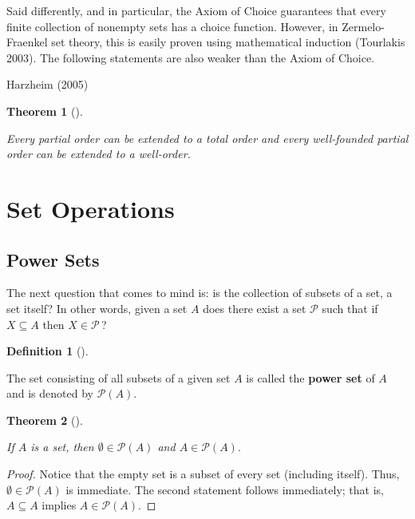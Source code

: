 \documentclass[
  letterpaper,
  10pt,
  reqno,
  twopage,
  openany]{book}
\theoremstyle{plain}
\theoremstyle{definition}
\theoremstyle{definition}
\newtheorem{definition}{Definition}[chapter]
\theoremstyle{definition}
\theoremstyle{plain}
\theoremstyle{plain}
\newtheorem{theorem}{Theorem}[chapter]
\theoremstyle{remark}
\begin{document}
Said differently, and in particular, the Axiom of Choice guarantees that
every finite collection of nonempty sets has a choice function. However,
in Zermelo-Fraenkel set theory, this is easily proven using mathematical
induction (Tourlakis 2003). The following statements are also weaker
than the Axiom of Choice.

Harzheim (2005)

\leavevmode{}%
\begin{theorem}[]\label{thm-extendord}

Every partial order can be extended to a total order and every
well-founded partial order can be extended to a well-order.

\end{theorem}

\hypertarget{set-operations}{%
\section{Set Operations}\label{set-operations}}

\hypertarget{power-sets}{%
\subsection{Power Sets}\label{power-sets}}

The next question that comes to mind is: is the collection of subsets of
a set, a set itself? In other words, given a set \(A\) does there exist
a set \(\mathcal{P}\) such that if \(X\subseteq A\) then
\(X\in \mathcal{P}\,\)?

\leavevmode{}%
\begin{definition}[]\label{def-power-set}

The set consisting of all subsets of a given set \(A\) is called the
 \textbf{power set} of \(A\) and is denoted by
\(\mathcal{P}(A).\)

\end{definition}

\leavevmode{}%
\begin{theorem}[]\label{thm-power-set}

If \(A\) is a set, then \(\emptyset \in \mathcal{P}(A)\) and
\(A\in \mathcal{P}(A).\)

\end{theorem}

\begin{proof}

Notice that the empty set is a subset of every set (including itself).
Thus, \(\emptyset \in \mathcal{P}(A)\) is immediate. The second
statement follows immediately; that is, \(A\subseteq A\) implies
\(A\in \mathcal{P}(A).\)

\end{proof}
\end{document}
